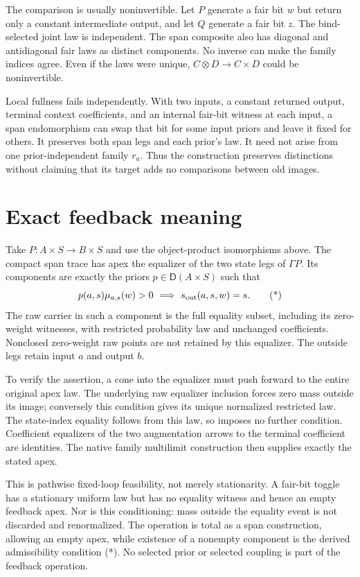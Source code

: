 \documentclass[11pt]{article}
\newcommand{\D}{\mathsf D}\newcommand{\E}{\mathcal E}\newcommand{\C}{\mathcal C}\newcommand{\F}{\operatorname{Fam}}
\begin{document}
The comparison is usually noninvertible. Let $P$ generate a fair bit $w$ but return only a constant intermediate output, and let $Q$ generate a fair bit $z$. The bind-selected joint law is independent. The span composite also has diagonal and antidiagonal fair laws as distinct components. No inverse can make the family indices agree. Even if the laws were unique, $C\otimes D\to C\times D$ could be noninvertible.

Local fullness fails independently. With two inputs, a constant returned output, terminal context coefficients, and an internal fair-bit witness at each input, a span endomorphism can swap that bit for some input priors and leave it fixed for others. It preserves both span legs and each prior's law. It need not arise from one prior-independent family $r_a$. Thus the construction preserves distinctions without claiming that its target adds no comparisons between old images.

\section{Exact feedback meaning}
Take $P:A\times S\to B\times S$ and use the object-product isomorphisms above. The compact span trace has apex the equalizer of the two state legs of $\Gamma P$. Its components are exactly the priors $p\in\D(A\times S)$ such that
\[
 p(a,s)\mu_{a,s}(w)>0\ \Longrightarrow\ s_{\rm out}(a,s,w)=s.
 \tag{*}
\]
The raw carrier in such a component is the full equality subset, including its zero-weight witnesses, with restricted probability law and unchanged coefficients. Nonclosed zero-weight raw points are not retained by this equalizer. The outside legs retain input $a$ and output $b$.

To verify the assertion, a cone into the equalizer must push forward to the entire original apex law. The underlying raw equalizer inclusion forces zero mass outside its image; conversely this condition gives its unique normalized restricted law. The state-index equality follows from this law, so imposes no further condition. Coefficient equalizers of the two augmentation arrows to the terminal coefficient are identities. The native family multilimit construction then supplies exactly the stated apex.

This is pathwise fixed-loop feasibility, not merely stationarity. A fair-bit toggle has a stationary uniform law but has no equality witness and hence an empty feedback apex. Nor is this conditioning: mass outside the equality event is not discarded and renormalized. The operation is total as a span construction, allowing an empty apex, while existence of a nonempty component is the derived admissibility condition (*). No selected prior or selected coupling is part of the feedback operation.
\end{document}
